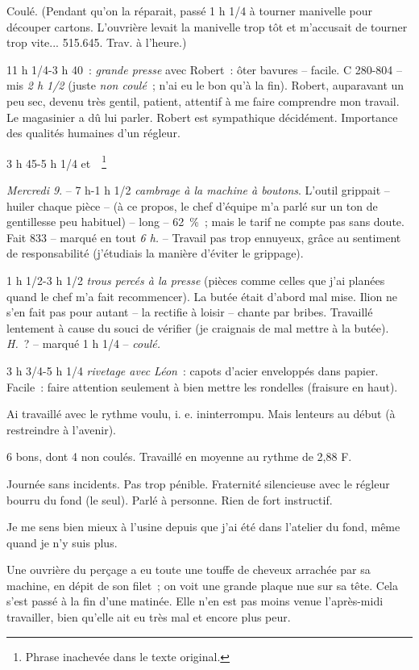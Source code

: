 \documentclass[french,twoside]{book} %
\begin{document}
Coulé. (Pendant qu'on la réparait, passé 1 h 1/4 à tourner manivelle pour découper cartons. L'ouvrière levait la manivelle trop tôt et m'accusait de tourner trop vite... 515.645. Trav. à l'heure.)\par
11 h 1/4-3 h 40 : {\itshape grande presse} avec Robert : ôter bavures – facile. C 280-804 – mis {\itshape 2 h 1/2} (juste {\itshape non coulé} ; n'ai eu le bon qu'à la fin). Robert, auparavant un peu sec, devenu très gentil, patient, attentif à me faire comprendre mon travail. Le magasinier a dû lui parler. Robert est sympathique décidément. Importance des qualités humaines d'un régleur.\par
3 h 45-5 h 1/4 et  \footnote{Phrase inachevée dans le texte original.}\par
{\itshape Mercredi 9}. – 7 h-1 h 1/2 {\itshape cambrage à la machine à boutons}. L'outil grippait – huiler chaque pièce – (à ce propos, le chef d'équipe m'a parlé sur un ton de gentillesse peu habituel) – long – 62 \% ; mais le tarif ne compte pas sans doute. Fait 833 – marqué en tout {\itshape 6 h.} – Travail pas trop ennuyeux, grâce au sentiment de responsabilité (j'étudiais la manière d'éviter le grippage).\par
1 h 1/2-3 h 1/2 {\itshape trous percés à la presse} (pièces comme celles que j'ai planées quand le chef m'a fait recommencer). La butée était d'abord mal mise. Ilion ne s'en fait pas pour autant – la rectifie à loisir – chante par bribes. Travaillé lentement à cause du souci de vérifier (je craignais de mal mettre à la butée). {\itshape H.} ? – marqué 1 h 1/4 – {\itshape coulé.}\par
3 h 3/4-5 h 1/4 {\itshape rivetage avec Léon} : capots d'acier enveloppés dans papier. Facile : faire attention seulement à bien mettre les rondelles (fraisure en haut).\par
Ai travaillé avec le rythme voulu, i. e. ininterrompu. Mais lenteurs au début (à restreindre à l'avenir).\par
6 bons, dont 4 non coulés. Travaillé en moyenne au rythme de 2,88 F.\par
Journée sans incidents. Pas trop pénible. Fraternité silencieuse avec le régleur bourru du fond (le seul). Parlé à personne. Rien de fort instructif.\par
Je me sens bien mieux à l'usine depuis que j'ai été dans l'atelier du fond, même quand je n'y suis plus.\par
Une ouvrière du perçage a eu toute une touffe de cheveux arrachée par sa machine, en dépit de son filet ; on voit une grande plaque nue sur sa tête. Cela s'est passé à la fin d'une matinée. Elle n'en est pas moins venue l'après-midi travailler, bien qu'elle ait eu très mal et encore plus peur.\par
\end{document}
